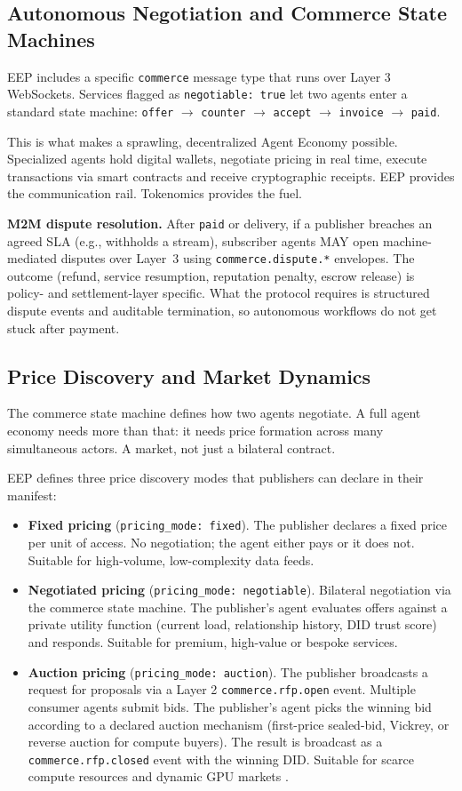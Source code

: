 \documentclass[12pt,a4paper]{article}
\begin{document}
\subsection{Autonomous Negotiation and Commerce State Machines}
EEP includes a specific \texttt{commerce} message type that runs over Layer 3 WebSockets. Services flagged as \texttt{negotiable: true} let two agents enter a standard state machine: \texttt{offer} $\to$ \texttt{counter} $\to$ \texttt{accept} $\to$ \texttt{invoice} $\to$ \texttt{paid}.

This is what makes a sprawling, decentralized Agent Economy possible. Specialized agents hold digital wallets, negotiate pricing in real time, execute transactions via smart contracts and receive cryptographic receipts. EEP provides the communication rail. Tokenomics provides the fuel.

\textbf{M2M dispute resolution.} After \texttt{paid} or delivery, if a publisher breaches an agreed SLA (e.g., withholds a stream), subscriber agents MAY open machine-mediated disputes over Layer~3 using \texttt{commerce.dispute.*} envelopes. The outcome (refund, service resumption, reputation penalty, escrow release) is policy- and settlement-layer specific. What the protocol requires is structured dispute events and auditable termination, so autonomous workflows do not get stuck after payment.

\subsection{Price Discovery and Market Dynamics}

The commerce state machine defines how two agents negotiate. A full agent economy needs more than that: it needs price formation across many simultaneous actors. A market, not just a bilateral contract.

EEP defines three price discovery modes that publishers can declare in their manifest:

\begin{itemize}
    \item \textbf{Fixed pricing} (\texttt{pricing\_mode: fixed}). The publisher declares a fixed price per unit of access. No negotiation; the agent either pays or it does not. Suitable for high-volume, low-complexity data feeds.
    \item \textbf{Negotiated pricing} (\texttt{pricing\_mode: negotiable}). Bilateral negotiation via the commerce state machine. The publisher's agent evaluates offers against a private utility function (current load, relationship history, DID trust score) and responds. Suitable for premium, high-value or bespoke services.
    \item \textbf{Auction pricing} (\texttt{pricing\_mode: auction}). The publisher broadcasts a request for proposals via a Layer 2 \texttt{commerce.rfp.open} event. Multiple consumer agents submit bids. The publisher's agent picks the winning bid according to a declared auction mechanism (first-price sealed-bid, Vickrey, or reverse auction for compute buyers). The result is broadcast as a \texttt{commerce.rfp.closed} event with the winning DID. Suitable for scarce compute resources and dynamic GPU markets \cite{ref19}.
\end{itemize}
\end{document}
